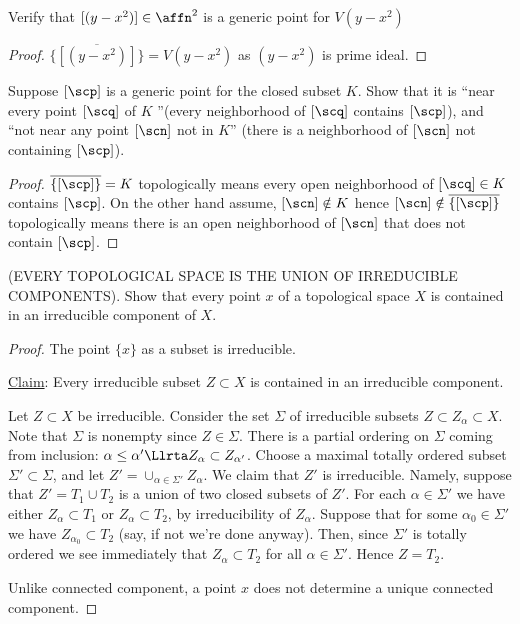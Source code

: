 \begin{exr}
Verify that $[(y - x^2)]\in\affn^2$  is a generic point for $V(y - x^2)$
\end{exr}
\begin{proof}
$\overline{\{[(y-x^2)]\}}=V(y-x^2)$ as $(y-x^2)$ is prime ideal.
\end{proof}

\begin{exr}
Suppose $[\scp]$ is a generic point for the closed subset $K$. Show that it is ``near every point $[\scq]$ of $K$ ''(every neighborhood of $[\scq]$ contains $[\scp]$), and ``not near any point $[\scn]$ not in $K$'' (there is a neighborhood of $[\scn]$ not containing $[\scp]$).
\end{exr}
\begin{proof}
$\overline{\{[\scp]\}}=K$ topologically means every open neighborhood of $[\scq]\in K$ contains $[\scp]$. On the other hand assume, $[\scn]\notin K$ hence $[\scn]\notin \overline{\{[\scp]\}}$ topologically means there is an open neighborhood of $[\scn]$ that does not contain $[\scp]$.
\end{proof}

\begin{exr}\label{chap3exr:UNION_OF IRREDUCIBLE_COMPONENTS}
(EVERY TOPOLOGICAL SPACE IS THE UNION OF IRREDUCIBLE COMPONENTS). Show that every point $x$ of a topological space $X$ is contained in an irreducible component of $X$.
\end{exr}
\begin{proof}
The point $\{x\}$ as a subset is irreducible. 

\underline{Claim}: Every irreducible subset $Z\subset X$ is contained in an irreducible component.

Let $Z\subset X$ be irreducible. Consider the set $\Sigma$ of irreducible subsets $Z\subset Z_\alpha\subset X$. Note that $\Sigma$ is nonempty since $Z\in \Sigma$. There is a partial ordering on $\Sigma$ coming from inclusion: $\alpha\leq \alpha'\Llrta Z_\alpha\subset Z_{\alpha'}$. Choose a maximal totally ordered subset $\Sigma' \subset \Sigma$, and let $Z'=\cup_{\alpha\in \Sigma'}Z_\alpha$. We claim that $Z'$ is irreducible. Namely, suppose that $Z'=T_1\cup T_2$ is a union of two closed subsets of $Z'$. For each $\alpha\in \Sigma'$ we have either $Z_\alpha\subset T_1$ or $Z_\alpha\subset T_2$, by irreducibility of $Z_\alpha$. Suppose that for some $\alpha_0\in \Sigma'$ we have $Z_{\alpha_0}\subset T_2$ (say, if not we're done anyway). Then, since $\Sigma'$ is totally ordered we see immediately that $Z_\alpha\subset T_2$ for all $\alpha\in \Sigma'$. Hence $Z=T_2$.

Unlike connected component, a point $x$ does not determine a unique connected component.
\end{proof}

